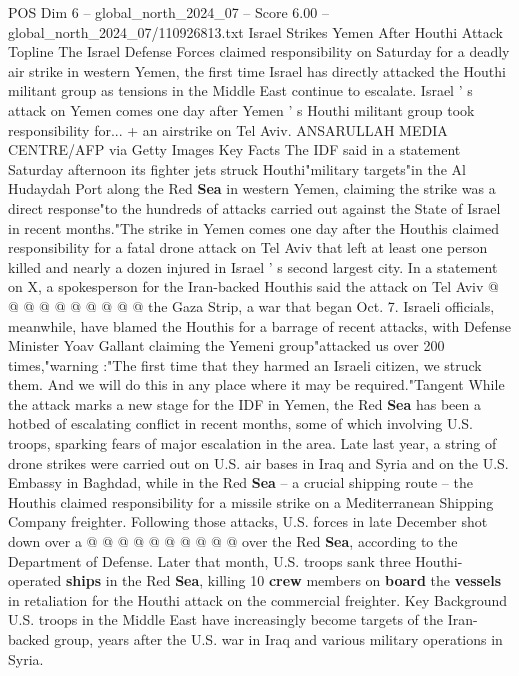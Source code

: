 \begin{textsample}{POS Dim 6 – global\_north\_2024\_07 – Score 6.00 – global\_north\_2024\_07/110926813.txt}  \label{ex:f6_pos_234}
Israel Strikes Yemen After Houthi Attack Topline The Israel Defense Forces claimed responsibility on Saturday for a deadly air strike in western Yemen, the first time Israel has directly attacked the Houthi militant group as tensions in the Middle East continue to escalate.
Israel ' s attack on Yemen comes one day after Yemen ' s Houthi militant group took responsibility for... + an airstrike on Tel Aviv.
ANSARULLAH MEDIA CENTRE/AFP via Getty Images Key Facts The IDF said in a statement Saturday afternoon its fighter jets struck Houthi"military targets"in the Al Hudaydah Port along the Red \textbf{Sea} in western Yemen, claiming the strike was a direct response"to the hundreds of attacks carried out against the State of Israel in recent months."The strike in Yemen comes one day after the Houthis claimed responsibility for a fatal drone attack on Tel Aviv that left at least one person killed and nearly a dozen injured in Israel ' s second largest city.
In a statement on X, a spokesperson for the Iran-backed Houthis said the attack on Tel Aviv @ @ @ @ @ @ @ @ @ @ the Gaza Strip, a war that began Oct. 7.
Israeli officials, meanwhile, have blamed the Houthis for a barrage of recent attacks, with Defense Minister Yoav Gallant claiming the Yemeni group"attacked us over 200 times,"warning :"The first time that they harmed an Israeli citizen, we struck them.
And we will do this in any place where it may be required."Tangent While the attack marks a new stage for the IDF in Yemen, the Red \textbf{Sea} has been a hotbed of escalating conflict in recent months, some of which involving U.S. troops, sparking fears of major escalation in the area.
Late last year, a string of drone strikes were carried out on U.S. air bases in Iraq and Syria and on the U.S.
Embassy in Baghdad, while in the Red \textbf{Sea} -- a crucial shipping route -- the Houthis claimed responsibility for a missile strike on a Mediterranean Shipping Company freighter.
Following those attacks, U.S. forces in late December shot down over a @ @ @ @ @ @ @ @ @ @ over the Red \textbf{Sea}, according to the Department of Defense.
Later that month, U.S. troops sank three Houthi-operated \textbf{ships} in the Red \textbf{Sea}, killing 10 \textbf{crew} members on \textbf{board} the \textbf{vessels} in retaliation for the Houthi attack on the commercial freighter.
Key Background U.S. troops in the Middle East have increasingly become targets of the Iran-backed group, years after the U.S. war in Iraq and various military operations in Syria.

\end{textsample}
